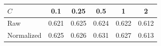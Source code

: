 \begin{tabular}{lccccc}
\toprule
$C$ & 0.1 & 0.25 & 0.5 & 1 & 2\\
\midrule
Raw & 0.621 & 0.625 & 0.624 & 0.622 & 0.612\\
Normalized & 0.625 & 0.626 & 0.631 & 0.627 & 0.613\\
\bottomrule
\end{tabular}
